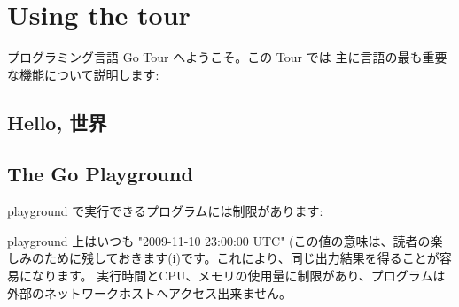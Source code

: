 \section{Using the tour}

プログラミング言語 Go Tour へようこそ。この Tour では
主に言語の最も重要な機能について説明します:

\subsection{Hello, 世界}




\subsection{The Go Playground}

playground で実行できるプログラムには制限があります:

playground 上はいつも "2009-11-10 23:00:00 UTC" (この値の意味は、読者の楽しみのために残しておきます(^^))です。これにより、同じ出力結果を得ることが容易になります。
実行時間とCPU、メモリの使用量に制限があり、プログラムは外部のネットワークホストへアクセス出来ません。


\newpage


